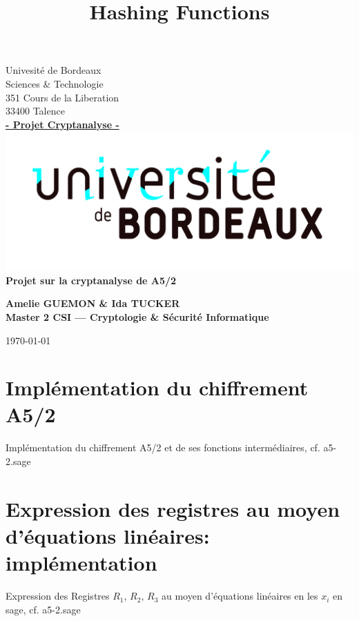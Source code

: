 \documentclass[a4paper]{article}
\title{Hashing Functions}
\author{}
\begin{document}
\begin{titlepage}
  \begin{sffamily}
  \begin{center}

    Univesité de Bordeaux\\ Sciences \& Technologie\\
           351 Cours de la Liberation\\33400 Talence\\[1em]
            \textbf{\underline{- Projet Cryptanalyse -}}\\[1.5cm]
           
    \includegraphics[scale=0.11]{UB.jpg}
    \\[3cm]

    { \huge \bfseries Projet sur la cryptanalyse de A5/2\\[0.5cm] }
    \begin{flushright}
      \bfseries {Amelie GUEMON \& Ida TUCKER\\[1em]Master 2 CSI --- Cryptologie \& Sécurité Informatique}\\[6.6cm]
    \end{flushright}
    
   
    \today

  \end{center}
  \end{sffamily}
\end{titlepage}

\section{Implémentation du chiffrement A5/2 }
Implémentation du chiffrement A5/2 et de ses fonctions intermédiaires, cf. a5-2.sage



\section{Expression des registres au moyen d'équations linéaires: implémentation}
Expression des Registres $R_1$, $R_2$, $R_3$ au moyen d'équations linéaires en les $x_i$ en sage, cf. a5-2.sage
\end{document}

